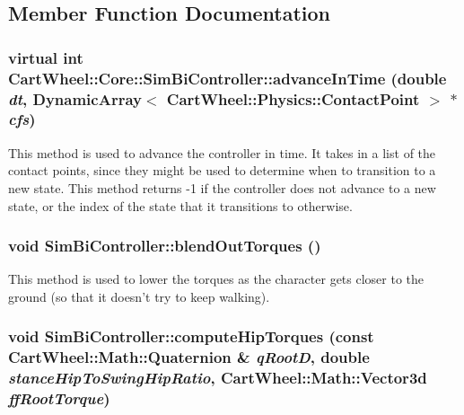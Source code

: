 \subsection{Member Function Documentation}
\hypertarget{classCartWheel_1_1Core_1_1SimBiController_a8289b2b2b785da4aa537fbd2fd39da51}{
\subsubsection[{advanceInTime}]{\setlength{\rightskip}{0pt plus 5cm}virtual int CartWheel::Core::SimBiController::advanceInTime (double {\em dt}, \/  DynamicArray$<$ {\bf CartWheel::Physics::ContactPoint} $>$ $\ast$ {\em cfs})}}
\label{classCartWheel_1_1Core_1_1SimBiController_a8289b2b2b785da4aa537fbd2fd39da51}
This method is used to advance the controller in time. It takes in a list of the contact points, since they might be used to determine when to transition to a new state. This method returns -\/1 if the controller does not advance to a new state, or the index of the state that it transitions to otherwise. \hypertarget{classCartWheel_1_1Core_1_1SimBiController_ad14b3ef705af33ee75b66a6af11729ed}{
\subsubsection[{blendOutTorques}]{\setlength{\rightskip}{0pt plus 5cm}void SimBiController::blendOutTorques ()}}
\label{classCartWheel_1_1Core_1_1SimBiController_ad14b3ef705af33ee75b66a6af11729ed}
This method is used to lower the torques as the character gets closer to the ground (so that it doesn't try to keep walking). \hypertarget{classCartWheel_1_1Core_1_1SimBiController_a5ee2b35043a54eecc824527cc1a1a575}{
\subsubsection[{computeHipTorques}]{\setlength{\rightskip}{0pt plus 5cm}void SimBiController::computeHipTorques (const {\bf CartWheel::Math::Quaternion} \& {\em qRootD}, \/  double {\em stanceHipToSwingHipRatio}, \/  {\bf CartWheel::Math::Vector3d} {\em ffRootTorque})}}
